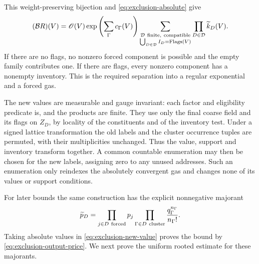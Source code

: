This weight-preserving bijection and \eqref{eq:exclusion-absolute}
give
\begin{equation}\label{eq:exclusion-output-gas}
 (\mathcal BR)(V)=\mathscr O(V)
   \exp\left(\sum_\Gamma c_\Gamma(V)\right)
   \sum_{\substack{\mathcal D\ {\rm finite,\ compatible}\\
                    \bigcup_{D\in\mathcal D}I_D=\operatorname{Flags}(V)}}
                                      \prod_{D\in\mathcal D}\widetilde k_D(V).
\end{equation}
If there are no flags, no nonzero forced component is possible and
the empty family contributes one. If there are flags, every nonzero
component has a nonempty inventory. This is the required separation
into a regular exponential and a forced gas.

The new values are measurable and gauge invariant: each factor and
eligibility predicate is, and the products are finite. They use only
the final coarse field and its flags on $Z_D$, by locality of the
constituents and of the inventory test. Under a signed lattice
transformation the old labels and the cluster occurrence tuples are
permuted, with their multiplicities unchanged. Thus the value,
support and inventory transform together. A common countable
enumeration may then be chosen for the new labels, assigning zero
to any unused addresses. Such an enumeration only reindexes the
absolutely convergent gas and changes none of its values or support
conditions.

For later bounds the same construction has the explicit nonnegative
majorant
\begin{equation}\label{eq:exclusion-output-price}
           \widetilde p_D=
              \prod_{j\in D\ {\rm forced}}p_j
              \prod_{\Gamma\in D\ {\rm cluster}}
                                      \frac{q_\Gamma^{n_\Gamma}}{n_\Gamma!}.
\end{equation}
Taking absolute values in \eqref{eq:exclusion-new-value} proves the
bound by \eqref{eq:exclusion-output-price}. We next prove the uniform
rooted estimate for these majorants.

